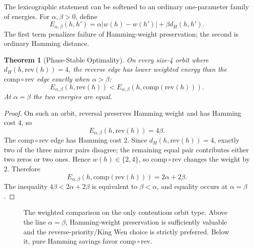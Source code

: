 \documentclass[11pt]{article}
\theoremstyle{definition}
\theoremstyle{plain}
\newtheorem{theorem}[definition]{Theorem}
\newcommand{\Ham}{d_H}
\newcommand{\comp}{\mathrm{comp}}
\newcommand{\rev}{\mathrm{rev}}
\begin{document}
The lexicographic statement can be softened to an ordinary one-parameter family of energies. For $\alpha,\beta>0$, define
\[
E_{\alpha,\beta}(h,h')=\alpha |w(h)-w(h')|+\beta\Ham(h,h').
\]
The first term penalizes failure of Hamming-weight preservation; the second is ordinary Hamming distance.

\begin{theorem}[Phase-Stable Optimality]\label{thm:phase}
On every size-4 orbit where $\Ham(h,\rev(h))=4$, the reverse edge has lower weighted energy than the $\comp\circ\rev$ edge exactly when $\alpha>\beta$:
\[
E_{\alpha,\beta}(h,\rev(h))
<
E_{\alpha,\beta}(h,\comp(\rev(h))).
\]
At $\alpha=\beta$ the two energies are equal.
\end{theorem}

\begin{proof}
On such an orbit, reversal preserves Hamming weight and has Hamming cost $4$, so
\[
E_{\alpha,\beta}(h,\rev(h))=4\beta.
\]
The $\comp\circ\rev$ edge has Hamming cost $2$. Since $\Ham(h,\rev(h))=4$, exactly two of the three mirror pairs disagree; the remaining equal pair contributes either two zeros or two ones. Hence $w(h)\in\{2,4\}$, so $\comp\circ\rev$ changes the weight by $2$. Therefore
\[
E_{\alpha,\beta}(h,\comp(\rev(h)))=2\alpha+2\beta.
\]
The inequality $4\beta<2\alpha+2\beta$ is equivalent to $\beta<\alpha$, and equality occurs at $\alpha=\beta$.
\end{proof}

\begin{figure}[ht]
\centering
{}
\caption{The weighted comparison on the only contentious orbit type. Above the line $\alpha=\beta$, Hamming-weight preservation is sufficiently valuable and the reverse-priority/King Wen choice is strictly preferred. Below it, pure Hamming savings favor $\comp\circ\rev$.}
\label{fig:phase}
\end{figure}
\end{document}
